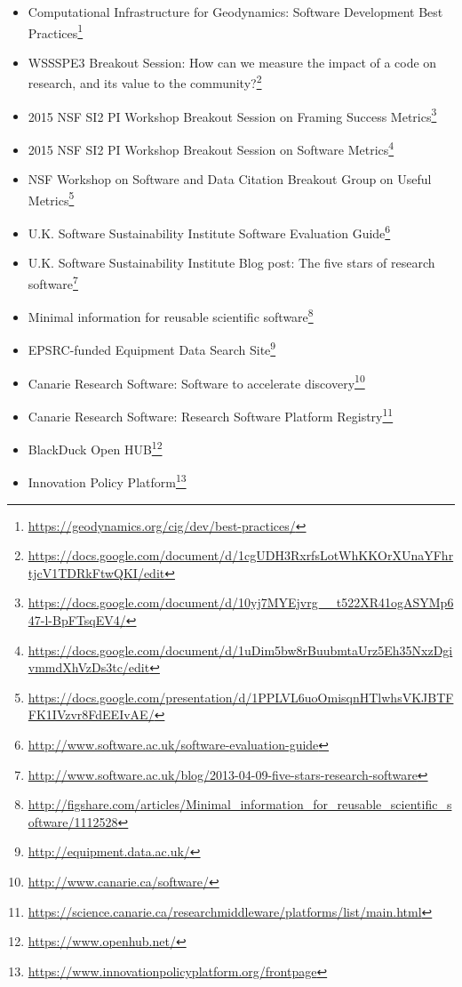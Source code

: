 \begin{itemize}

\item Computational Infrastructure for Geodynamics: Software Development Best
Practices\footnote{\url{https://geodynamics.org/cig/dev/best-practices/}}

\item WSSSPE3 Breakout Session: How can we measure the impact of a code on
research, and its value to the
community?\footnote{\url{https://docs.google.com/document/d/1cgUDH3RxrfsLotWhKKOrXUnaYFhrtjcV1TDRkFtwQKI/edit}}

\item 2015 NSF SI2 PI Workshop Breakout Session on Framing Success
Metrics\footnote{\url{https://docs.google.com/document/d/10yj7MYEjvrg__t522XR41ogASYMp647-l-BpFTsqEV4/}}

\item 2015 NSF SI2 PI Workshop Breakout Session on Software
Metrics\footnote{\url{https://docs.google.com/document/d/1uDim5bw8rBuubmtaUrz5Eh35NxzDgivmmdXhVzDs3tc/edit}}

\item NSF Workshop on Software and Data Citation Breakout Group on Useful
Metrics\footnote{\url{https://docs.google.com/presentation/d/1PPLVL6uoOmisqnHTlwhsVKJBTFFK1IVzvr8FdEEIvAE/}}

\item U.K. Software Sustainability Institute Software Evaluation
Guide\footnote{\url{http://www.software.ac.uk/software-evaluation-guide}}

\item U.K. Software Sustainability Institute Blog post: The five stars of
research
software\footnote{\url{http://www.software.ac.uk/blog/2013-04-09-five-stars-research-software}}

\item Minimal information for reusable scientific
software\footnote{\url{http://figshare.com/articles/Minimal_information_for_reusable_scientific_software/1112528}}

\item EPSRC-funded Equipment Data Search
Site\footnote{\url{http://equipment.data.ac.uk/}}

\item Canarie Research Software: Software to accelerate
discovery\footnote{\url{http://www.canarie.ca/software/}}

\item Canarie Research Software: Research Software Platform
Registry\footnote{\url{https://science.canarie.ca/researchmiddleware/platforms/list/main.html}}

\item BlackDuck Open HUB\footnote{\url{https://www.openhub.net/}}
\item Innovation Policy
Platform\footnote{\url{https://www.innovationpolicyplatform.org/frontpage}}


\end{itemize}



